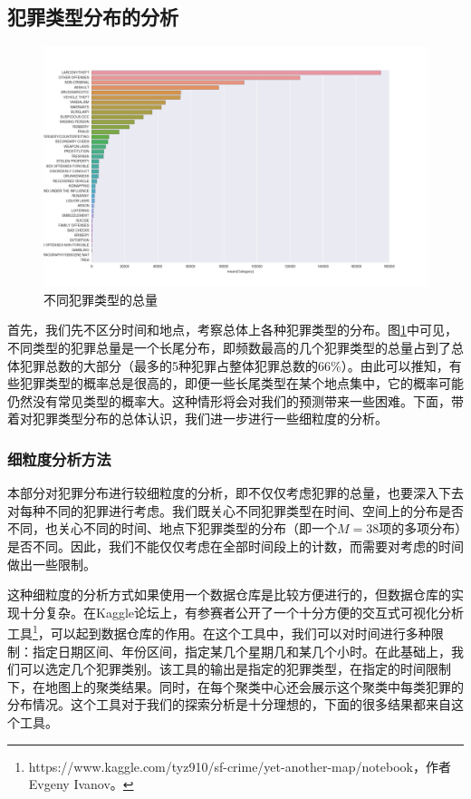 \subsection{犯罪类型分布的分析}

\begin{figure}[tb]
    \centering
    \includegraphics[width=1.0\linewidth]{fig/category}
    \caption{不同犯罪类型的总量}
    \label{fig:tot_category}
\end{figure}

首先，我们先不区分时间和地点，考察总体上各种犯罪类型的分布。图\ref{fig:tot_category}中可见，不同类型的犯罪总量是一个长尾分布，即频数最高的几个犯罪类型的总量占到了总体犯罪总数的大部分（最多的5种犯罪占整体犯罪总数的66\%）。由此可以推知，有些犯罪类型的概率总是很高的，即便一些长尾类型在某个地点集中，它的概率可能仍然没有常见类型的概率大。这种情形将会对我们的预测带来一些困难。下面，带着对犯罪类型分布的总体认识，我们进一步进行一些细粒度的分析。

\subsubsection{细粒度分析方法}

本部分对犯罪分布进行较细粒度的分析，即不仅仅考虑犯罪的总量，也要深入下去对每种不同的犯罪进行考虑。我们既关心不同犯罪类型在时间、空间上的分布是否不同，也关心不同的时间、地点下犯罪类型的分布（即一个$M=38$项的多项分布）是否不同。因此，我们不能仅仅考虑在全部时间段上的计数，而需要对考虑的时间做出一些限制。

这种细粒度的分析方式如果使用一个数据仓库是比较方便进行的，但数据仓库的实现十分复杂。在Kaggle论坛上，有参赛者公开了一个十分方便的交互式可视化分析工具\footnote{https://www.kaggle.com/tyz910/sf-crime/yet-another-map/notebook，作者Evgeny Ivanov。}，可以起到数据仓库的作用。在这个工具中，我们可以对时间进行多种限制：指定日期区间、年份区间，指定某几个星期几和某几个小时。在此基础上，我们可以选定几个犯罪类别。该工具的输出是指定的犯罪类型，在指定的时间限制下，在地图上的聚类结果。同时，在每个聚类中心还会展示这个聚类中每类犯罪的分布情况。这个工具对于我们的探索分析是十分理想的，下面的很多结果都来自这个工具。






